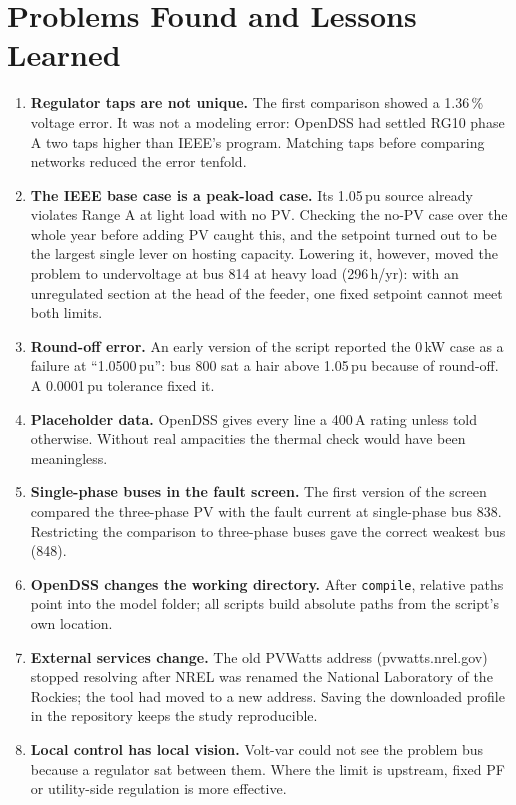 \documentclass[11pt,letterpaper]{article}
\begin{document}
\section{Problems Found and Lessons Learned}
\begin{enumerate}
  \item \textbf{Regulator taps are not unique.} The first comparison showed a 1.36\,\% voltage error. It was
        not a modeling error: OpenDSS had settled RG10 phase A two taps higher than IEEE's program. Matching taps
        before comparing networks reduced the error tenfold.
  \item \textbf{The IEEE base case is a peak-load case.} Its 1.05\,pu source already violates Range A at light
        load with no PV. Checking the no-PV case over the whole year before adding PV caught this, and the
        setpoint turned out to be the largest single lever on hosting capacity. Lowering it, however, moved the
        problem to undervoltage at bus 814 at heavy load (296\,h/yr): with an unregulated section at the head of
        the feeder, one fixed setpoint cannot meet both limits.
  \item \textbf{Round-off error.} An early version of the script reported the 0\,kW case as a failure at
        ``1.0500\,pu'': bus 800 sat a hair above 1.05\,pu because of round-off. A 0.0001\,pu tolerance fixed it.
  \item \textbf{Placeholder data.} OpenDSS gives every line a 400\,A rating unless told otherwise. Without real
        ampacities the thermal check would have been meaningless.
  \item \textbf{Single-phase buses in the fault screen.} The first version of the screen compared the
        three-phase PV with the fault current at single-phase bus 838. Restricting the comparison to three-phase
        buses gave the correct weakest bus (848).
  \item \textbf{OpenDSS changes the working directory.} After \texttt{compile}, relative paths point into the
        model folder; all scripts build absolute paths from the script's own location.
  \item \textbf{External services change.} The old PVWatts address (pvwatts.nrel.gov) stopped resolving after
        NREL was renamed the National Laboratory of the Rockies; the tool had moved to a new address.
        Saving the downloaded profile in the repository keeps the study reproducible.
  \item \textbf{Local control has local vision.} Volt-var could not see the problem bus because a regulator
        sat between them. Where the limit is upstream, fixed PF or utility-side regulation is more effective.
\end{enumerate}
\end{document}
